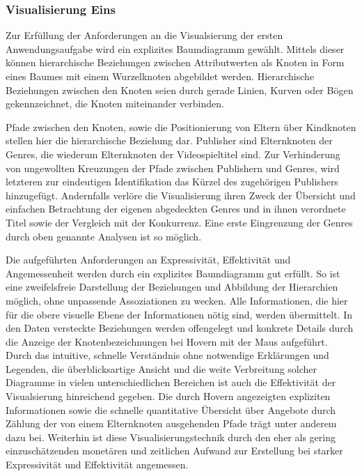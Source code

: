 \documentclass[usegeometry=true]{scrartcl}
\begin{document}
\subsubsection{Visualisierung Eins}
Zur Erfüllung der Anforderungen an die Visualsierung der ersten Anwendungsaufgabe wird ein explizites Baumdiagramm gewählt.
Mittels dieser können hierarchische Beziehungen zwischen Attributwerten als Knoten in Form eines Baumes mit einem Wurzelknoten abgebildet werden. 
Hierarchische Beziehungen zwischen den Knoten seien durch gerade Linien, Kurven oder Bögen gekennzeichnet, die Knoten miteinander verbinden.%

Pfade zwischen den Knoten, sowie die Positionierung von Eltern über Kindknoten stellen hier die hierarchische Beziehung dar. 
Publisher sind Elternknoten der Genres, die wiederum Elternknoten der Videospieltitel sind.
Zur Verhinderung von ungewollten Kreuzungen der Pfade zwischen Publishern und Genres, wird letzteren zur eindeutigen Identifikation das Kürzel des zugehörigen Publishers hinzugefügt.
Andernfalls verlöre die Visualisierung ihren Zweck der Übersicht und einfachen Betrachtung der eigenen abgedeckten Genres und in ihnen verordnete Titel sowie der Vergleich mit der Konkurrenz.
Eine erste Eingrenzung der Genres durch oben genannte Analysen ist so möglich.

Die aufgeführten Anforderungen an Expressivität, Effektivität und Angemessenheit werden durch ein explizites Baumdiagramm gut erfüllt.
So ist eine zweifelsfreie Darstellung der Beziehungen und Abbildung der Hierarchien möglich, ohne unpassende Assoziationen zu wecken. 
Alle Informationen, die hier für die obere visuelle Ebene der Informationen nötig sind, werden übermittelt. 
In den Daten versteckte Beziehungen werden offengelegt und konkrete Details durch die Anzeige der Knotenbezeichnungen bei Hovern mit der Maus aufgeführt.
Durch das intuitive, schnelle Verständnis ohne notwendige Erklärungen und Legenden, die überblicksartige Ansicht und die weite Verbreitung solcher Diagramme in vielen unterschiedlichen Bereichen ist auch die Effektivität der Visualsierung hinreichend gegeben. 
Die durch Hovern angezeigten expliziten Informationen sowie die schnelle quantitative Übersicht über Angebote durch Zählung der von einem Elternknoten ausgehenden Pfade trägt unter anderem dazu bei.
Weiterhin ist diese Visualisierungstechnik durch den eher als gering einzuschätzenden monetären und zeitlichen Aufwand zur Erstellung bei starker Expressivität und Effektivität angemessen.
\end{document}
